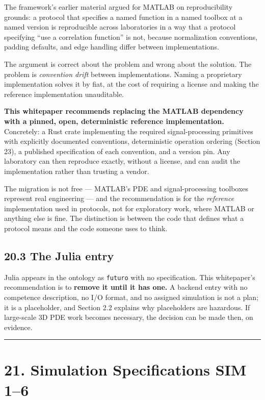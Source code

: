 \documentclass[
  11pt]{report}
\begin{document}
The framework's earlier material argued for MATLAB on reproducibility
grounds: a protocol that specifies a named function in a named toolbox
at a named version is reproducible across laboratories in a way that a
protocol specifying ``use a correlation function'' is not, because
normalization conventions, padding defaults, and edge handling differ
between implementations.

The argument is correct about the problem and wrong about the solution.
The problem is \emph{convention drift} between implementations. Naming a
proprietary implementation solves it by fiat, at the cost of requiring a
license and making the reference implementation unauditable.

\textbf{This whitepaper recommends replacing the MATLAB dependency with
a pinned, open, deterministic reference implementation.} Concretely: a
Rust crate implementing the required signal-processing primitives with
explicitly documented conventions, deterministic operation ordering
(Section 23), a published specification of each convention, and a
version pin. Any laboratory can then reproduce exactly, without a
license, and can audit the implementation rather than trusting a vendor.

The migration is not free --- MATLAB's PDE and signal-processing
toolboxes represent real engineering --- and the recommendation is for
the \emph{reference} implementation used in protocols, not for
exploratory work, where MATLAB or anything else is fine. The distinction
is between the code that defines what a protocol means and the code
someone uses to think.

\hypertarget{the-julia-entry}{%
\section{20.3 The Julia entry}\label{the-julia-entry}}

Julia appears in the ontology as \texttt{futuro} with no specification.
This whitepaper's recommendation is to \textbf{remove it until it has
one.} A backend entry with no competence description, no I/O format, and
no assigned simulation is not a plan; it is a placeholder, and Section
2.2 explains why placeholders are hazardous. If large-scale 3D PDE work
becomes necessary, the decision can be made then, on evidence.

\begin{center}\rule{0.5\linewidth}{0.5pt}\end{center}

\hypertarget{simulation-specifications-sim-16}{%
\chapter{21. Simulation Specifications SIM
1--6}\label{simulation-specifications-sim-16}}
\end{document}
